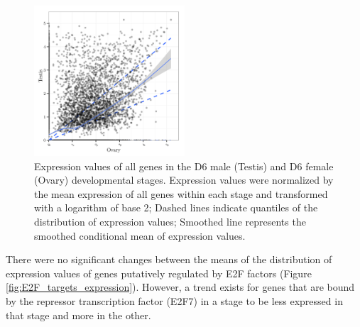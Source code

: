 \documentclass[11pt,twoside,a4paper]{report}
\begin{document}
		\begin{figure}[here]
			\centering
			\includegraphics[width=0.5\textwidth]{pngs/D6_expression.png}
			\caption{Expression values of all genes in the D6 male (Testis) and D6 female (Ovary) developmental stages.
			{\footnotesize
				Expression values were normalized by the mean expression of all genes within each stage and transformed with a logarithm of base 2;
				Dashed lines indicate quantiles of the distribution of expression values;
				Smoothed line represents the smoothed conditional mean of expression values.
				}
			}
			\label{fig:D6_expression}
		\end{figure}

    	There were no significant changes between the means of the distribution of expression values of genes putatively regulated by E2F factors (Figure \ref{fig:E2F_targets_expression}).	However, a trend exists for genes that are bound by the repressor transcription factor (E2F7) in a stage to be less expressed in that stage and more in the other.
		
\end{document}
